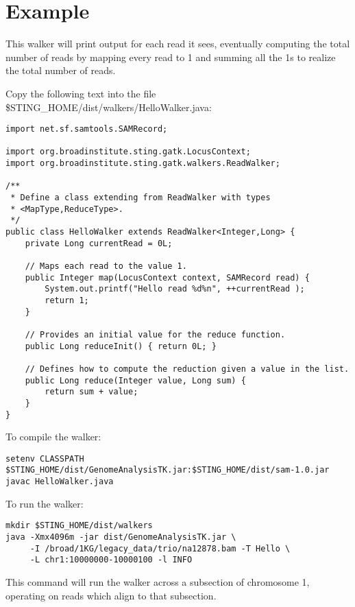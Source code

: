 \documentclass[11pt,fullpage]{article}
\begin{document}
\section{Example}
This walker will print output for each read it sees, eventually computing the
total number of reads by mapping every read to 1 and summing all the 1s to
realize the total number of reads.

\begin{samepage}
Copy the following text into the file \$STING\_HOME/dist/walkers/HelloWalker.java:

\begin{verbatim}
import net.sf.samtools.SAMRecord;

import org.broadinstitute.sting.gatk.LocusContext;
import org.broadinstitute.sting.gatk.walkers.ReadWalker;

/**
 * Define a class extending from ReadWalker with types
 * <MapType,ReduceType>.  
 */
public class HelloWalker extends ReadWalker<Integer,Long> {
    private Long currentRead = 0L;

    // Maps each read to the value 1.
    public Integer map(LocusContext context, SAMRecord read) {
        System.out.printf("Hello read %d%n", ++currentRead );
        return 1; 
    }

    // Provides an initial value for the reduce function.
    public Long reduceInit() { return 0L; }
    
    // Defines how to compute the reduction given a value in the list. 
    public Long reduce(Integer value, Long sum) { 
        return sum + value;
    }
}
\end{verbatim}
\end{samepage}
To compile the walker:
\begin{verbatim}
setenv CLASSPATH $STING_HOME/dist/GenomeAnalysisTK.jar:$STING_HOME/dist/sam-1.0.jar
javac HelloWalker.java
\end{verbatim}
To run the walker:
\begin{verbatim}
mkdir $STING_HOME/dist/walkers
java -Xmx4096m -jar dist/GenomeAnalysisTK.jar \
     -I /broad/1KG/legacy_data/trio/na12878.bam -T Hello \
     -L chr1:10000000-10000100 -l INFO
\end{verbatim}
This command will run the walker across a subsection of chromosome 1, operating on 
reads which align to that subsection.  
\end{document}
